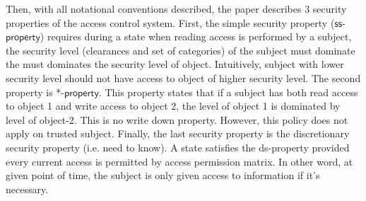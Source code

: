 \documentclass[11pt]{article}
\begin{document}
\begin{description}
Then, with all notational conventions described, the paper describes 3 security properties of the access control system. First,  the simple security property ($\mathsf{ss}$-$\mathsf{property}$) requires during a state when reading access is performed by a subject, the security level (clearances and set of categories) of the subject must dominate the 
must dominates the security level of object. Intuitively, subject with lower security level should not have access to object of higher security level.  The second property is *-$\mathsf{property}$. This property states that if a subject has both read access to object 1 and write access to object 2,  the level of object 1 is dominated by level of object-2. This is no write down property. However, this policy does not apply on trusted subject. Finally,  the last security property is the discretionary security property (i.e. need to know). A state satisfies the ds-property provided every current access is permitted by access permission matrix. In other word, at given point of time, the subject is only given access to information if it's necessary.
\end{description}
\end{document}
